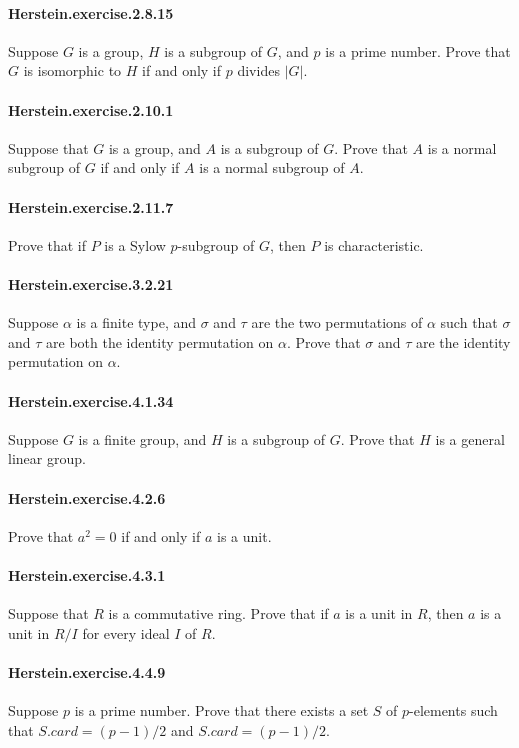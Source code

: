 \documentclass{article}
\begin{document}
\paragraph{Herstein.exercise.2.8.15} Suppose $G$ is a group, $H$ is a subgroup of $G$, and $p$ is a prime number. Prove that $G$ is isomorphic to $H$ if and only if $p$ divides $|G|$.

\paragraph{Herstein.exercise.2.10.1} Suppose that $G$ is a group, and $A$ is a subgroup of $G$. Prove that $A$ is a normal subgroup of $G$ if and only if $A$ is a normal subgroup of $A$.

\paragraph{Herstein.exercise.2.11.7} Prove that if $P$ is a Sylow $p$-subgroup of $G$, then $P$ is characteristic.

\paragraph{Herstein.exercise.3.2.21} Suppose $α$ is a finite type, and $σ$ and $τ$ are the two permutations of $α$ such that $σ$ and $τ$ are both the identity permutation on $α$. Prove that $σ$ and $τ$ are the identity permutation on $α$.

\paragraph{Herstein.exercise.4.1.34} Suppose $G$ is a finite group, and $H$ is a subgroup of $G$. Prove that $H$ is a general linear group.

\paragraph{Herstein.exercise.4.2.6} Prove that $a^2 = 0$ if and only if $a$ is a unit.

\paragraph{Herstein.exercise.4.3.1} Suppose that $R$ is a commutative ring. Prove that if $a$ is a unit in $R$, then $a$ is a unit in $R/I$ for every ideal $I$ of $R$.

\paragraph{Herstein.exercise.4.4.9} Suppose $p$ is a prime number. Prove that there exists a set $S$ of $p$-elements such that $S.card = (p-1)/2$ and $S.card = (p-1)/2$.
\end{document}
